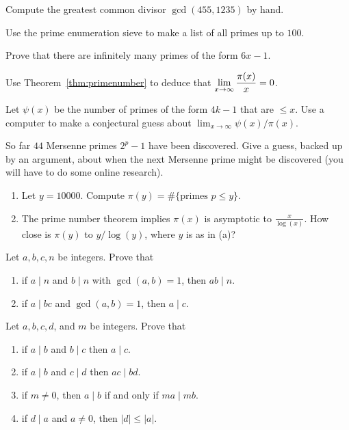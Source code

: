 \begin{exercises}

\item Compute the greatest common divisor $\gcd(455,1235)$ by hand.

\item\label{ex:handsieve} Use the prime enumeration sieve
to make a list of all primes up to $100$.

\item\label{ex:primesform} Prove that there are infinitely
many primes of the form $6x-1$.

\item \label{ex:fewprimes}
Use Theorem~\ref{thm:primenumber} to deduce that
$\displaystyle \lim_{x\to\infty} \frac{\pi(x)}{x} = 0$.

\item Let $\psi(x)$ be the number of primes of the form
$4k-1$ that are $\leq x$.  Use a computer to make a conjectural
guess about $\lim_{x\to\infty} \psi(x) / \pi(x)$.

\item So far $44$ Mersenne primes $2^p-1$ have been discovered.
Give a guess, backed up by an argument, about
when the next Mersenne prime might be discovered (you will have
to do some online research).

\item
 \begin{enumerate}
\item Let $y=10000$.  Compute
  $\pi(y) = \#\{ \text{primes } p \leq y\}.$
\item The prime number theorem implies $\pi(x)$ is
asymptotic to $\frac{x}{\log(x)}$.  How close is $\pi(y)$ to
$y/\log(y)$, where $y$ is as in (a)?
\end{enumerate}

\item Let $a,b,c,n$ be integers.  Prove that
\begin{enumerate}
\item if $a \mid n$ and $b\mid n$ with $\gcd(a,b)=1$, then $ab\mid n$.
\item if $a\mid bc$ and $\gcd(a,b)=1$, then $a\mid c$.
\end{enumerate}

\item Let $a,b,c,d$, and $m$ be integers.  Prove that
\begin{enumerate}
\item if $a\mid b$ and $b\mid c$ then $a\mid c$. %
\item if $a\mid b$ and $c\mid d$ then $ac\mid bd$.
\item if $m\neq 0$, then $a\mid b$ if and only if $ma\mid mb$.
\item if $d\mid a$ and $a\neq 0$, then $|d|\leq |a|$.
\end{enumerate}


\end{exercises}
